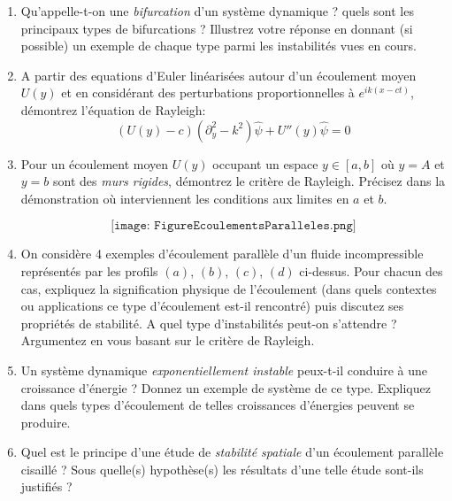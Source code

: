 \documentclass[a4paper,11pt]{article}
\begin{document}
\begin{enumerate}

\item Qu'appelle-t-on une {\em bifurcation } d'un système dynamique ? quels sont les principaux types de bifurcations ? Illustrez votre réponse en donnant (si possible) un exemple de chaque type parmi les instabilités 
vues en cours.


\item A partir des equations d'Euler linéarisées autour d'un écoulement moyen $U(y)$ et en considérant des perturbations proportionnelles à $e^{i k (x - c t)}$, démontrez l'équation de Rayleigh:
$$
(U(y)-c) \left( \partial_y^2 - k^2 \right) \hat{\psi}  + U''(y)  \hat{\psi} =0
$$

\item Pour un écoulement moyen $U(y)$ occupant un espace $y\in [a,b]$ où $y=A$ et $y=b$ sont des {\em murs rigides}, démontrez le critère de Rayleigh. Précisez dans la démonstration où interviennent les conditions aux limites en $a$ et $b$.
 

$$
\texttt{[image: FigureEcoulementsParalleles.png]}
$$

\item 
On considère 4 exemples d'écoulement parallèle d'un fluide incompressible représentés par les profils $(a)$, $(b)$, $(c)$, $(d)$ ci-dessus.
Pour chacun des cas, expliquez la signification physique de l'écoulement (dans quels contextes ou applications ce type d'écoulement est-il rencontré)
puis discutez ses propriétés de stabilité. A quel type d'instabilités peut-on s'attendre ?  Argumentez en vous basant sur le critère de Rayleigh.

\item Un système dynamique {\em exponentiellement instable} peux-t-il conduire à une croissance d'énergie ?
Donnez un exemple de système de ce type. Expliquez dans quels types d'écoulement de telles croissances d'énergies peuvent se produire.

\item Quel est le principe d'une étude de {\em stabilité spatiale} d'un écoulement parallèle cisaillé ?
Sous quelle(s) hypothèse(s) les résultats d'une telle étude sont-ils justifiés ?


\end{enumerate}

\clearpage


\end{document}
